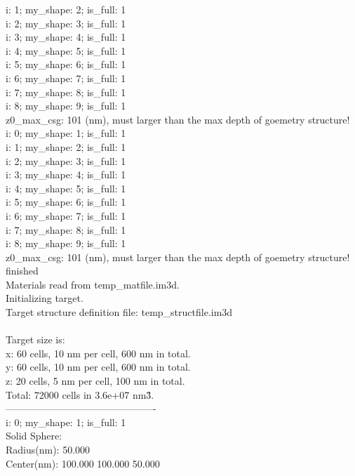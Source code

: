 i: 1; my\_shape:  2; is\_full:   1\\
i: 2; my\_shape:  3; is\_full:   1\\
i: 3; my\_shape:  4; is\_full:   1\\
i: 4; my\_shape:  5; is\_full:   1\\
i: 5; my\_shape:  6; is\_full:   1\\
i: 6; my\_shape:  7; is\_full:   1\\
i: 7; my\_shape:  8; is\_full:   1\\
i: 8; my\_shape:  9; is\_full:   1\\
z0\_max\_csg: 101 (nm), must larger than the max depth of goemetry structure!\\
i: 0; my\_shape:  1; is\_full:   1\\
i: 1; my\_shape:  2; is\_full:   1\\
i: 2; my\_shape:  3; is\_full:   1\\
i: 3; my\_shape:  4; is\_full:   1\\
i: 4; my\_shape:  5; is\_full:   1\\
i: 5; my\_shape:  6; is\_full:   1\\
i: 6; my\_shape:  7; is\_full:   1\\
i: 7; my\_shape:  8; is\_full:   1\\
i: 8; my\_shape:  9; is\_full:   1\\
z0\_max\_csg: 101 (nm), must larger than the max depth of goemetry structure!\\
 finished\\
Materials read from temp\_matfile.im3d.\\
Initializing target.\\
Target structure definition file: temp\_structfile.im3d\\
\\
Target size is: \\
x: 60 cells, 10 nm per cell, 600 nm in total.\\
y: 60 cells, 10 nm per cell, 600 nm in total.\\
z: 20 cells, 5 nm per cell, 100 nm in total.\\
Total: 72000 cells in 3.6e+07 nm\^3.\\
----------------------------------------------\\
i: 0; my\_shape:  1; is\_full:   1\\
  Solid Sphere:\\
    Radius(nm):   50.000\\
    Center(nm):  100.000  100.000   50.000\\
